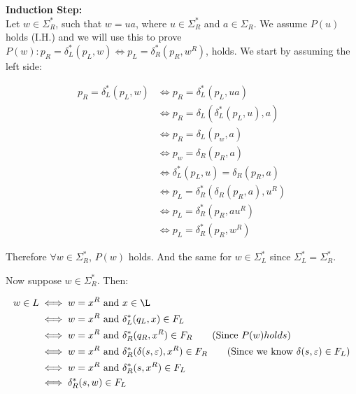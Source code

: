 \documentclass[20pt]{article}
\begin{document}
\noindent
\begin{text}
    \noindent
    \textbf{Induction Step:}\\
    Let $w \in \Sigma_R^*$, such that $w = ua$, where $u \in \Sigma_R^*$ and $a \in \Sigma_R$. We assume $P(u)$ holds (I.H.) and we will use this to prove $P(w): p_R = \delta_L^*(p_L, w) \iff p_L = \delta_R^*(p_R, w^R)$, holds. We start by assuming the left side:
\end{text}

\begin{align}
    p_R = \delta_L^*(p_L, w) &\iff p_R = \delta_L^*(p_L, ua)\nonumber\tag{By definition of $w$}\\
    &\iff p_R = \delta_L(\delta_L^*(p_L, u), a)\nonumber\\
    &\iff p_R = \delta_L(p_w, a)\nonumber\tag{By I.H. $\exists p_w$ s.t. $p_w = \delta_L^*(p_L,u)$}\\
    &\iff p_w = \delta_R(p_R, a)\nonumber\tag{By construction of $\delta_R^*$}\\
    &\iff \delta_L^*(p_L, u) = \delta_R(p_R, a)\nonumber\tag{By I.H. again}\\
    &\iff p_L = \delta_R^*(\delta_R(p_R, a), u^R)\nonumber\\
    &\iff p_L = \delta_R^*(p_R, au^R)\nonumber\\
    &\iff p_L = \delta_R^*(p_R, w^R)\nonumber\tag{$w=au^R$}
\end{align}

\noindent
\begin{text}
    Therefore $\forall w \in \Sigma_R^*$, $P(w)$ holds. And the same for $w \in \Sigma_L^*$ since $\Sigma_L^* = \Sigma_R^*$.\\
\end{text}

\noindent
\begin{text}
    Now suppose $w \in \Sigma_R^*$. Then:
\end{text}
\begin{align}
    w \in L &\iff w = x^R\text{ and }x \in \L\nonumber\\
    &\iff w = x^R\text{ and }\delta_L^*(q_L, x) \in F_L\nonumber\\
    &\iff w = x^R\text{ and }\delta_R^*(q_R, x^R) \in F_R\nonumber\tag{Since $P(w) holds$}\\
    &\iff w = x^R\text{ and }\delta_R^*(\delta(s,\varepsilon), x^R) \in F_R\nonumber\tag{Since we know $\delta(s,\varepsilon) \in F_L$}\\
    &\iff w = x^R\text{ and }\delta_R^*(s, x^R) \in F_L\nonumber\\
    &\iff \delta_R^*(s, w) \in F_L\nonumber
\end{align}
\end{document}
